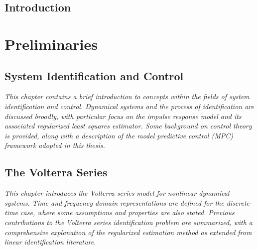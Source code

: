 \documentclass[11pt,twoside]{report}
\begin{document}
\cleardoublepage
\chapter{Introduction}
\label{chap:1}
\newpage


\cleardoublepage
\part{Preliminaries}
\label{part:prelim}

\cleardoublepage
\chapter{System Identification and Control}
\label{chap:2}
\emph{This chapter contains a brief introduction to concepts within the fields of system identification and control. Dynamical systems and the process of identification are discussed broadly, with particular focus on the impulse response model and its associated regularized least squares estimator. Some background on control theory is provided, along with a description of the model predictive control (MPC) framework adopted in this thesis.}
\newpage


\cleardoublepage
\chapter{The Volterra Series}
\label{chap:3}
\emph{This chapter introduces the Volterra series model for nonlinear dynamical systems. Time and frequency domain representations are defined for the discrete-time case, where some assumptions and properties are also stated. Previous contributions to the Volterra series identification problem are summarized, with a comprehensive explanation of the regularized estimation method as extended from linear identification literature.}
\newpage

\end{document}
